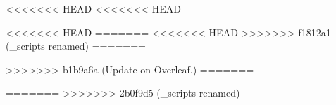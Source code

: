 

% 
% 
\setcounter{chapter}{1}
<<<<<<< HEAD
<<<<<<< HEAD

<<<<<<< HEAD
% 
% 
=======
<<<<<<< HEAD
>>>>>>> f1812a1 (_scripts renamed)
% 
% 
=======


>>>>>>> b1b9a6a (Update on Overleaf.)
=======

% 
% 
=======
% 
% 
% 
>>>>>>> 2b0f9d5 (_scripts renamed)
% 
% 

